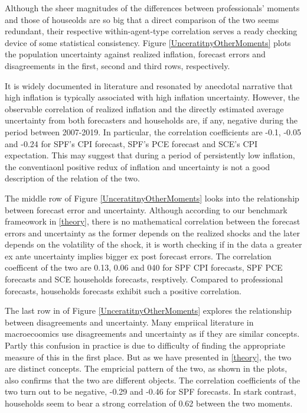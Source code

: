 \documentclass[]{article}
\begin{document}
Although the sheer magnitudes of the differences between professionals' moments and those of houseolds are so big that a direct comparison of the two seems redundant, their respective within-agent-type correlation serves a ready checking device of some statistical consistency. Figure \ref{UnceratitnyOtherMoments} plots the population uncertainty against realized inflation,  forecast errors and disagreements in the first, second and third rows, respectively. 

It is widely documented in literature \cite{xxx, xxx} and resonated by anecdotal narrative that high inflation is typically associated with high inflation uncertainty. However, the observable correlation of realized inflation and the directly estimated average uncertainty from both  forecasters and households are, if any, negative during the period between 2007-2019. In particular, the correlation coefficients are -0.1, -0.05 and -0.24 for SPF's  CPI forecast, SPF's PCE forecast and SCE's CPI expectation. This may suggest that during a period of persistently low inflation, the conventiaonl positive redux of inflation and uncertainty is not a good description of the relation of the two. 

The middle row of Figure \ref{UnceratitnyOtherMoments} looks into the relationship between forecast error and uncertainty. Although according to our benchmark frameowork in \ref{theory}, there is no mathematical correlation between the forecast errors and uncertainty as the former depends on the realized shocks and the later depends on the volatility of the shock, it is worth checking if in the data a greater ex ante uncertainty implies bigger ex post forecast errors. The correlation coefficent of the two are 0.13, 0.06 and 040 for SPF CPI forecasts, SPF PCE forecasts and SCE households forecasts, resptively. Compared to professional forecasts, households forecasts exhibit such a positive correlation.  
 
 The last row in of Figure \ref{UnceratitnyOtherMoments} explores the relationship between disagreements and uncertainty. Many empriical literature in macroecoomics use disagreements and uncertainty as if they are similar concepts. Partly this confusion in practice is due to difficulty of finding the appropriate measure of this in the first place. But as we have presented in \ref{theory}, the two are distinct concepts. The empricial pattern of the two,  as shown in the plots, also confirms that the two are different objects. The correlation coefficients of the two turn out to be negative, -0.29 and -0.46 for SPF forecasts. In stark contrast, households seem to bear a strong correlation of 0.62 between the two moments.  
 
\end{document}

